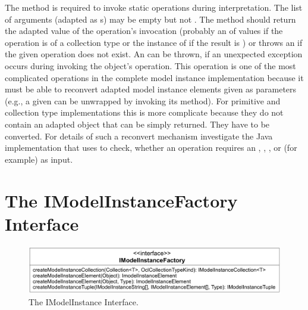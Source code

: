 The method 
is required to invoke static operations during interpretation. The list of 
arguments (adapted as s) may be empty but
not . The method should return the adapted value of the operation's 
invocation (probably an  of values if the 
operation is of a collection type or the instance of 
if the result is ) or throws an 
 if the given operation does not 
exist. An  can be thrown, if an
unexpected exception occurs during invoking the object's operation. This
operation is one of the most complicated operations in the complete model
instance implementation because it must be able to reconvert adapted model
instance elements given as parameters (e.g., a given
 can be unwrapped by invoking its 
method). For primitive and collection type implementations this is more
complicate because they do not contain an adapted object that can be simply
returned. They have to be converted. For details of such a reconvert mechanism
investigate the Java implementation that uses  to
check, whether an operation requires an , ,
, or  (for example) as input.



\section{The IModelInstanceFactory Interface}

\begin{figure}
	\centering
	\includegraphics[width=1.0\linewidth]{figures/modelInstanceTypeAdaptation/modelInstanceFactoryInterface}
	\caption{The IModelInstance Interface.}
	\label{pic:modelInstanceTypeAdaptation:modelInstanceFactoryInterface}
\end{figure}

